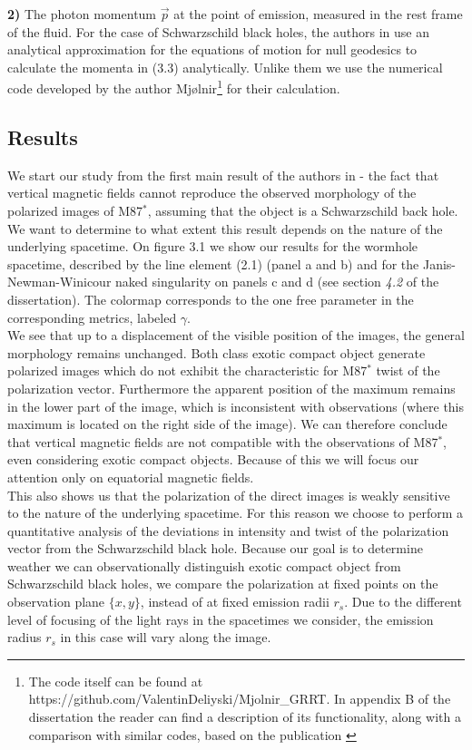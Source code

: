 \documentclass[12pt]{article}
\numberwithin{equation}{section}
\numberwithin{figure}{section}
\begin{document}
	\textbf{2)} The photon momentum $\vec{p}$ at the point of emission, measured in the rest frame of the fluid. For the case of Schwarzschild black holes, the authors in \cite{Narayan2021} use an analytical approximation for the equations of motion for null geodesics to calculate the momenta in (3.3) analytically. Unlike them we use the numerical code developed by the author Mjølnir\footnote{The code itself can be found at https://github.com/ValentinDeliyski/Mjolnir\_GRRT. In appendix B of the dissertation the reader can find a description of its functionality, along with a comparison with similar codes, based on the publication \cite{Gold2020}} for their calculation.
	\newpage
	\subsection{Results}
	
	We start our study from the first main result of the authors in \cite{Narayan2021} - the fact that vertical magnetic fields cannot reproduce the observed morphology of the polarized images of M87$^*$, assuming that the object is a Schwarzschild back hole. We want to determine to what extent this result depends on the nature of the underlying spacetime. On figure 3.1 we show our results for the wormhole spacetime, described by the line element (2.1) (panel a and b) and for the Janis-Newman-Winicour naked singularity on panels c and d (see section \emph{4.2} of the dissertation). The colormap corresponds to the one free parameter in the corresponding metrics, labeled $\gamma$.\\
	
	We see that up to a displacement of the visible position of the images, the general morphology remains unchanged. Both class exotic compact object generate polarized images which do not exhibit the characteristic for M87$^*$ twist of the polarization vector. Furthermore the apparent position of the maximum remains in the lower part of the image, which is inconsistent with observations (where this maximum is located on the right side of the image). We can therefore conclude that vertical magnetic fields are not compatible with the observations of M87$^*$, even considering exotic compact objects. Because of this we will focus our attention only on equatorial magnetic fields.\\

	This also shows us that the polarization of the direct images is weakly sensitive to the nature of the underlying spacetime. For this reason we choose to perform a quantitative analysis of the deviations in intensity and twist of the polarization vector from the Schwarzschild black hole. Because our goal is to determine weather we can observationally distinguish exotic compact object from Schwarzschild black holes, we compare the polarization at fixed points on the observation plane $\{x,y\}$, instead of at fixed emission radii $r_s$. Due to the different level of focusing of the light rays in the spacetimes we consider, the emission radius $r_s$ in this case will vary along the image.\\
	
\end{document}

